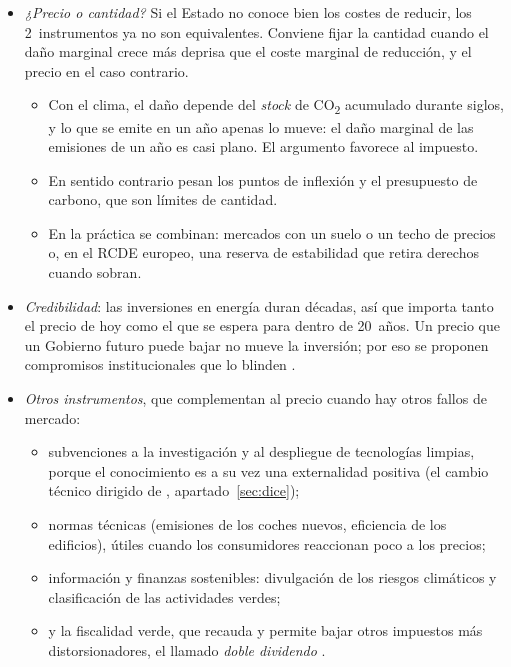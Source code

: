 \documentclass[11pt]{article}
\begin{document}
\begin{itemize}
\begin{itemize}
  \end{itemize}
\item \emph{¿Precio o cantidad?} Si el Estado no conoce bien los costes de reducir, los 2~instrumentos ya no son equivalentes. Conviene fijar la cantidad cuando el daño marginal crece más deprisa que el coste marginal de reducción, y el precio en el caso contrario\nocite{Weitzman1974Prices}.
  \begin{itemize}
  \item Con el clima, el daño depende del \emph{stock} de CO\textsubscript{2} acumulado durante siglos, y lo que se emite en un año apenas lo mueve: el daño marginal de las emisiones de un año es casi plano. El argumento favorece al impuesto\nocite{Pizer2002Combining}.
  \item En sentido contrario pesan los puntos de inflexión y el presupuesto de carbono, que son límites de cantidad.
  \item En la práctica se combinan: mercados con un suelo o un techo de precios o, en el RCDE europeo, una reserva de estabilidad que retira derechos cuando sobran\nocite{CE2026TNAC}.
  \end{itemize}
\item \emph{Credibilidad}: las inversiones en energía duran décadas, así que importa tanto el precio de hoy como el que se espera para dentro de 20~años. Un precio que un Gobierno futuro puede bajar no mueve la inversión; por eso se proponen compromisos institucionales que lo blinden\nocite{HelmHepburnMash2003Credible} .
\item \emph{Otros instrumentos}, que complementan al precio cuando hay otros fallos de mercado:
  \begin{itemize}
  \item subvenciones a la investigación y al despliegue de tecnologías limpias, porque el conocimiento es a su vez una externalidad positiva (el cambio técnico dirigido de \textcite{Acemoglu2012Environment}, apartado~\ref{sec:dice});
  \item normas técnicas (emisiones de los coches nuevos, eficiencia de los edificios), útiles cuando los consumidores reaccionan poco a los precios;
  \item información y finanzas sostenibles: divulgación de los riesgos climáticos y clasificación de las actividades verdes;
  \item y la fiscalidad verde, que recauda y permite bajar otros impuestos más distorsionadores, el llamado \emph{doble dividendo} .
  \end{itemize}

\end{itemize}
\end{document}
